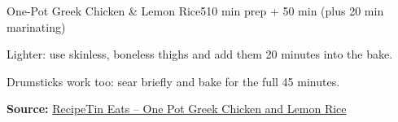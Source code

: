 \begin{recipebox}{One-Pot Greek Chicken \& Lemon Rice}{5}{10 min prep + 50 min (plus 20 min marinating)}
\begin{notelist}
  \item Lighter: use skinless, boneless thighs and add them 20 minutes into the bake.
  \item Drumsticks work too: sear briefly and bake for the full 45 minutes.
\end{notelist}

\noindent\textbf{Source:} \href{https://www.recipetineats.com/one-pot-greek-chicken-lemon-rice/}{RecipeTin Eats -- One Pot Greek Chicken and Lemon Rice}

\end{recipebox}
